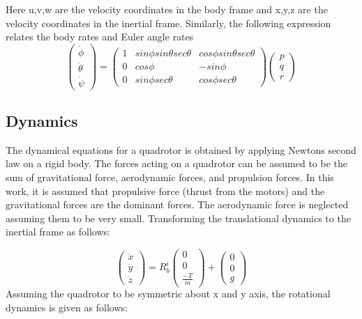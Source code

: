 	Here u,v,w are the velocity coordinates in the body frame and x,y,z are the
	velocity coordinates in the inertial frame. Similarly, the following expression
	relates the body rates and Euler angle rates
	\begin{equation}
	\begin{pmatrix}
	\dot{\phi} \\ \dot{\theta} \\ \dot{\psi}
	\end{pmatrix} = \begin{pmatrix}
	1 & sin\phi sin\theta sec\theta & cos\phi sin\theta sec\theta \\
	0 & cos\phi & -sin\phi \\
	0 & sin\phi sec\theta & cos\phi sec\theta
	\end{pmatrix} \begin{pmatrix}
	p \\ q \\ r
	\end{pmatrix}
	\end{equation}
	
	
	\subsection{Dynamics}
	\label{sec: Dynamics}
	
	The dynamical equations for a quadrotor is obtained by applying Newtons second law on a rigid body. The forces acting on a quadrotor can be assumed to be the sum of gravitational force, aerodynamic forces, and propulsion forces. In this work, it is assumed that propulsive force (thrust from the motors) and the gravitational forces are the dominant forces. The aerodynamic force is neglected assuming them to be very small. Transforming the translational dynamics to the inertial frame as follows:
	
	\begin{equation}
	\begin{pmatrix}
	\ddot{x} \\ \ddot{y} \\ \ddot{z}
	\end{pmatrix}
		= R^{i}_b \begin{pmatrix}
		0 \\ 0 \\ \frac{-T}{m}
		\end{pmatrix}
		+ \begin{pmatrix}
		0 \\ 0 \\ g
		\end{pmatrix}
	\end{equation}
	Assuming the quadrotor to be symmetric about x and y axis, the rotational dynamics is given as follows:
	
